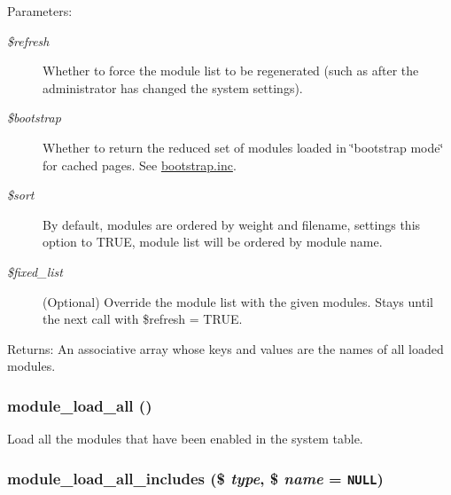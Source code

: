 \begin{Desc}
\item[Parameters:]
\begin{description}
\item[{\em \$refresh}]Whether to force the module list to be regenerated (such as after the administrator has changed the system settings). \item[{\em \$bootstrap}]Whether to return the reduced set of modules loaded in \char`\"{}bootstrap mode\char`\"{} for cached pages. See \hyperlink{bootstrap_8inc}{bootstrap.inc}. \item[{\em \$sort}]By default, modules are ordered by weight and filename, settings this option to TRUE, module list will be ordered by module name. \item[{\em \$fixed\_\-list}](Optional) Override the module list with the given modules. Stays until the next call with \$refresh = TRUE. \end{description}
\end{Desc}
\begin{Desc}
\item[Returns:]An associative array whose keys and values are the names of all loaded modules. \end{Desc}
\hypertarget{module_8inc_7fcc599da5ee48260c6372b51d28dbe5}{
\subsubsection[{module\_\-load\_\-all}]{\setlength{\rightskip}{0pt plus 5cm}module\_\-load\_\-all ()}}
\label{module_8inc_7fcc599da5ee48260c6372b51d28dbe5}


Load all the modules that have been enabled in the system table. \hypertarget{module_8inc_4e2123e44529b4d307fc1ac78519e966}{
\subsubsection[{module\_\-load\_\-all\_\-includes}]{\setlength{\rightskip}{0pt plus 5cm}module\_\-load\_\-all\_\-includes (\$ {\em type}, \/  \$ {\em name} = {\tt NULL})}}
\label{module_8inc_4e2123e44529b4d307fc1ac78519e966}


